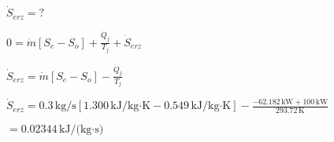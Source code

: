 \( \dot{S}_{erz} = ? \)  

\( 0 = \dot{m} \left[ S_e - S_o \right] + \frac{\dot{Q}_j}{T_j} + \dot{S}_{erz} \)  

\( \dot{S}_{erz} = \dot{m} \left[ S_e - S_o \right] - \frac{\dot{Q}_j}{T_j} \)  

\( \dot{S}_{erz} = 0.3 \, \text{kg/s} \left[ 1.300 \, \text{kJ/kg·K} - 0.549 \, \text{kJ/kg·K} \right] - \frac{-62.182 \, \text{kW} + 100 \, \text{kW}}{293.72 \, \text{K}} \)  

\( = 0.02344 \, \text{kJ/(kg·s)} \)